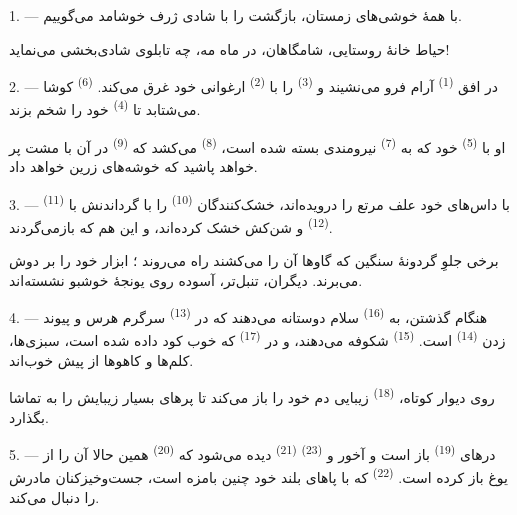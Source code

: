 \VUsaut{3.0mm}
\VUsaut{3.0mm}

\VUsaut{4.0mm}
\VUsaut{4.0mm}

1. --- با همهٔ خوشی‌های زمستان، بازگشت  را با شادی ژرف
خوشامد می‌گوییم.

حیاط خانهٔ روستایی، شامگاهان، در ماه مه، چه تابلوی شادی‌بخشی می‌نماید!

2. --- در افق  \textsuperscript{(1)} آرام فرو می‌نشیند و
 \textsuperscript{(3)} را با 
\textsuperscript{(2)} ارغوانی خود غرق می‌کند. 
\textsuperscript{(6)} کوشا می‌شتابد تا 
\textsuperscript{(4)} خود را شخم بزند.

او با  \textsuperscript{(5)} خود که به 
\textsuperscript{(7)} نیرومندی بسته شده است، 
\textsuperscript{(8)} می‌کشد که  \textsuperscript{(9)}
در آن با مشت پر  خواهد پاشید که خوشه‌های زرین خواهد داد.

3. ---  \textsuperscript{(11)} با داس‌های خود علف مرتع
را درویده‌اند، خشک‌کنندگان  \textsuperscript{(10)} را با
گرداندنش با  \textsuperscript{(12)} و شن‌کش خشک کرده‌اند،
و این هم که بازمی‌گردند.

برخی جلوِ گردونهٔ سنگین که گاوها آن را می‌کشند راه می‌روند ؛ ابزار خود
را بر دوش می‌برند. دیگران، تنبل‌تر، آسوده روی یونجهٔ خوشبو نشسته‌اند.

4. --- هنگام گذشتن، به  \textsuperscript{(16)} سلام
دوستانه می‌دهند که در  \textsuperscript{(13)} سرگرم
هرس  و پیوند زدن 
\textsuperscript{(14)} است.  \textsuperscript{(15)}
شکوفه می‌دهند، و در  \textsuperscript{(17)} که خوب
کود داده شده است، سبزی‌ها، کلم‌ها و کاهوها از پیش خوب‌اند.

روی دیوار کوتاه،  \textsuperscript{(18)} زیبایی دم خود را
باز می‌کند تا پرهای بسیار زیبایش را به تماشا بگذارد.

\VUsaut{3.0mm}
\VUsaut{3.0mm}

5. --- درهای  \textsuperscript{(19)} باز است و آخور و
 \textsuperscript{(23)} 
\textsuperscript{(21)} دیده می‌شود که 
\textsuperscript{(20)} همین حالا آن را از یوغ باز کرده است.
 \textsuperscript{(22)} که با پاهای بلند خود چنین
بامزه است، جست‌وخیزکنان مادرش را دنبال می‌کند.

